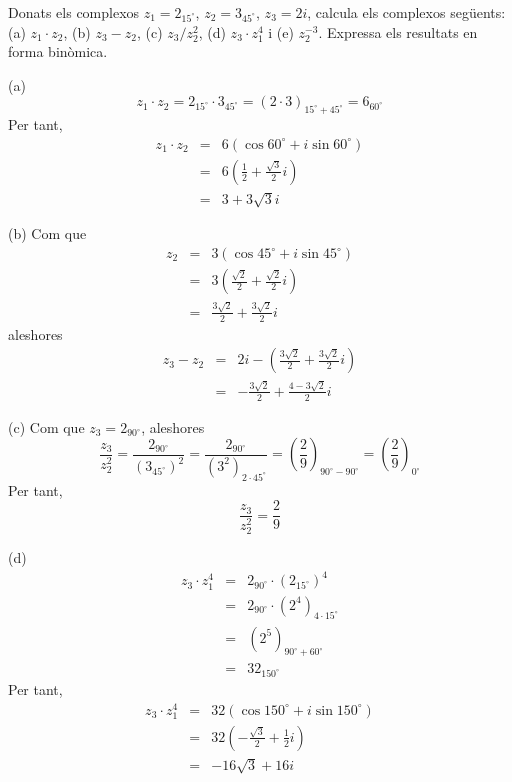 \begin{exemple}
Donats els complexos $z_{1}=2_{15
^{\circ}
}$, $z_{2}=3_{45
^{\circ}
}$, $z_{3}=2i$, calcula els complexos següents: (a) $z_{1}\cdot z_{2}$,
(b) $z_{3}-z_{2}$, (c) $z_{3}/z_{2}^{2}$, (d) $z_{3}\cdot z_{1}^{4}$ i (e) $
z_{2}^{-3}$. Expressa els resultats en forma binòmica.
\end{exemple}

\begin{solucio}
(a)
\begin{equation*}
z_{1}\cdot z_{2}=2_{15
^{\circ}
}\cdot 3_{45
^{\circ}
}=\left( 2\cdot 3\right) _{15
^{\circ}
+45
^{\circ}
}=6_{60
^{\circ}
}
\end{equation*}
Per tant,
\begin{eqnarray*}
z_{1}\cdot z_{2} &=&6(\cos 60
^{\circ}
+i\sin 60
^{\circ}
) \\
&=&6\left( \frac{1}{2}+\frac{\sqrt{3}}{2}i\right) \\
&=&3+3\sqrt{3}i
\end{eqnarray*}

(b) Com que
\begin{eqnarray*}
z_{2} &=&3(\cos 45
^{\circ}
+i\sin 45
^{\circ}
) \\
&=&3\left( \frac{\sqrt{2}}{2}+\frac{\sqrt{2}}{2}i\right) \\
&=&\frac{3\sqrt{2}}{2}+\frac{3\sqrt{2}}{2}i
\end{eqnarray*}
aleshores
\begin{eqnarray*}
z_{3}-z_{2} &=&2i-\left( \frac{3\sqrt{2}}{2}+\frac{3\sqrt{2}}{2}i\right) \\
&=&-\frac{3\sqrt{2}}{2}+\frac{4-3\sqrt{2}}{2}i
\end{eqnarray*}

(c) Com que $z_{3}=2_{90
^{\circ}
}$, aleshores
\begin{equation*}
\frac{z_{3}}{z_{2}^{2}}=\frac{2_{90
^{\circ}
}}{\left( 3_{45
^{\circ}
}\right) ^{2}}=\frac{2_{90
^{\circ}
}}{\left( 3^{2}\right) _{2\cdot 45
^{\circ}
}}=\left( \frac{2}{9}\right) _{90
^{\circ}
-90
^{\circ}
}=\left( \frac{2}{9}\right) _{0
^{\circ}
}
\end{equation*}
Per tant,
\begin{equation*}
\frac{z_{3}}{z_{2}^{2}}=\frac{2}{9}
\end{equation*}

(d)
\begin{eqnarray*}
z_{3}\cdot z_{1}^{4} &=&2_{90
^{\circ}
}\cdot \left( 2_{15
^{\circ}
}\right) ^{4} \\
&=&2_{90
^{\circ}
}\cdot \left( 2^{4}\right) _{4\cdot 15
^{\circ}
} \\
&=&\left( 2^{5}\right) _{90
^{\circ}
+60
^{\circ}
} \\
&=&32_{150
^{\circ}
}
\end{eqnarray*}
Per tant,
\begin{eqnarray*}
z_{3}\cdot z_{1}^{4} &=&32(\cos 150
^{\circ}
+i\sin 150
^{\circ}
) \\
&=&32\left( -\frac{\sqrt{3}}{2}+\frac{1}{2}i\right) \\
&=&-16\sqrt{3}+16i
\end{eqnarray*}


\end{solucio}
